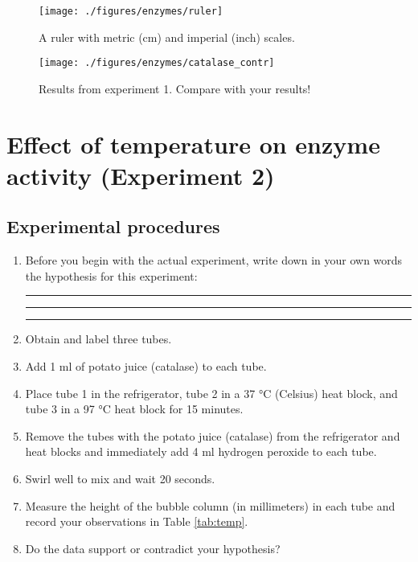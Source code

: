 \begin{figure}

{\centering \texttt{[image: ./figures/enzymes/ruler]} 

}

\caption{A ruler with metric (cm) and imperial (inch) scales.}\label{fig:ruler}
\end{figure}

\begin{figure}

{\centering \texttt{[image: ./figures/enzymes/catalase\_contr]} 

}

\caption{Results from experiment 1. Compare with your results!}\label{fig:contr}
\end{figure}

\section{Effect of temperature on enzyme activity (Experiment
2)}\label{effect-of-temperature-on-enzyme-activity-experiment-2}

\subsection{Experimental procedures}\label{experimental-procedures-21}

\begin{enumerate}
\def\labelenumi{\arabic{enumi}.}
\item
  Before you begin with the actual experiment, write down in your own
  words the hypothesis for this experiment:

  \begin{center}\rule{0.5\linewidth}{\linethickness}\end{center}

  \begin{center}\rule{0.5\linewidth}{\linethickness}\end{center}

  \begin{center}\rule{0.5\linewidth}{\linethickness}\end{center}
\item
  Obtain and label three tubes.
\item
  Add 1 ml of potato juice (catalase) to each tube.
\item
  Place tube 1 in the refrigerator, tube 2 in a 37 °C (Celsius) heat
  block, and tube 3 in a 97 °C heat block for 15 minutes.
\item
  Remove the tubes with the potato juice (catalase) from the
  refrigerator and heat blocks and immediately add 4 ml hydrogen
  peroxide to each tube.
\item
  Swirl well to mix and wait 20 seconds.
\item
  Measure the height of the bubble column (in millimeters) in each tube
  and record your observations in Table \ref{tab:temp}.
\item
  Do the data support or contradict your hypothesis?
\end{enumerate}

